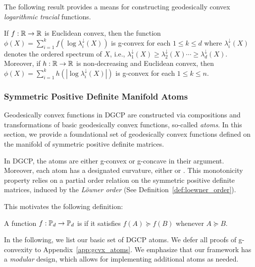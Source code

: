 \documentclass[twoside,11pt]{article}
\newcommand{\mw}[1]{\textcolor{blue}{\emph{MW: #1}}}
\begin{document}
The following result provides a means for constructing geodesically convex  \textit{logarithmic tracial} functions.

\begin{theorem}\label{theorem:sra_logtrace}
    If $f: \mathbb{R} \to \mathbb{R}$ is Euclidean convex, then the function $\phi(X) = \sum_{i=1}^k f \left(\log \lambda^\downarrow_i(X)\right)$ is g-convex for each $1 \leq k \leq d$ where $\lambda_i^\downarrow(X)$ denotes the ordered spectrum of $X$, i.e., $\lambda_1^\downarrow(X) \geq \lambda_2^\downarrow(X) \cdots \geq \lambda_d^\downarrow(X)$. Moreover, if $h: \mathbb{R} \to \mathbb{R}$ is non-decreasing and Euclidean convex, then $\phi(X) = \sum_{i=1}^k h(|\log \lambda_i^\downarrow(X)|)$ is g-convex for each $1 \leq k \leq n$.
\end{theorem}





\subsubsection{Symmetric Positive Definite Manifold Atoms}\label{sec:atoms}
Geodesically convex functions in DGCP are constructed via compositions and transformations of basic geodesically convex functions, so-called \textit{atoms}. In this section, we provide a foundational set of geodesically convex functions defined on the manifold of symmetric positive definite matrices. 



In DGCP, the atoms are either g-convex or g-concave in their argument. Moreover, each atom has a designated curvature, either  or . This monotonicity property relies on a partial order relation on the symmetric positive definite matrices, induced by the \emph{Löwner order} (See Definition~\ref{def:loewner_order}).

This motivates the following definition:
\begin{definition}
    A function $f:\mathbb{P}_d \to \mathbb{P}_d$ 
    is  if it satisfies 
    $f(A) \succeq f(B)$
    whenever $A \succeq B$. 
\end{definition}
%
In the following, we list our basic set of DGCP atoms. We defer all proofs of g-convexity to Appendix~\ref{app:gcvx_atoms}. We emphasize that our framework has a \emph{modular} design, which allows for implementing additional atoms as needed. 
\end{document}
